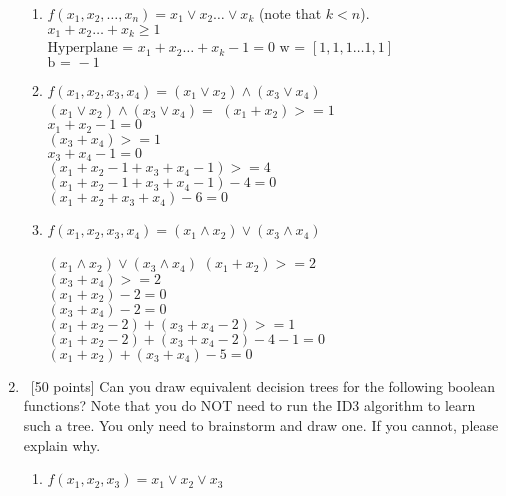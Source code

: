 \documentclass[12pt, fullpage,letterpaper]{article}
\begin{document}
\begin{enumerate}
\begin{enumerate}
\item $f(x_1, x_2, \ldots, x_n) = x_1 \lor x_2 \ldots \lor x_k$ (note that  $k <n$).\\
    $ x_1 + x_2 \ldots + x_k \geq 1$\\
    $\text{Hyperplane = } x_1 + x_2 \ldots + x_k - 1= 0$
    $\text{w = } [1, 1, 1 \dots 1, 1]$\\
    $\text{b = } -1$
\item $f(x_1, x_2, x_3, x_4) = (x_1 \lor x_2) \land (x_3 \lor x_4)$\\

$(x_1 \lor x_2) \land (x_3 \lor x_4) = $
$(x_1 + x_2) >= 1$\\
$x_1 + x_2 - 1 = 0$\\

$(x_3 + x_4) >= 1$\\
$x_3 + x_4 - 1 = 0$\\

$(x_1 + x_2 - 1 + x_3 + x_4 - 1) >= 4$\\
$(x_1 + x_2 - 1 + x_3 + x_4 - 1) - 4 = 0$\\
$(x_1 + x_2 + x_3 + x_4) - 6 = 0$\\


\item $f(x_1, x_2, x_3, x_4) = (x_1 \land x_2) \lor (x_3 \land x_4)$

$(x_1 \land x_2) \lor (x_3 \land x_4)$
$(x_1 + x_2) >= 2$\\
$(x_3 + x_4) >= 2$\\

$(x_1 + x_2) - 2 = 0$\\
$(x_3 + x_4) - 2 = 0$\\

$(x_1 + x_2 - 2) + (x_3 + x_4 - 2) >= 1$\\
$(x_1 + x_2 - 2) + (x_3 + x_4 - 2) - 4 - 1 = 0$\\
$(x_1 + x_2) + (x_3 + x_4) - 5 = 0$\\


\end{enumerate}

\item~[50 points] Can you draw  equivalent decision trees for the following boolean functions? Note that you do NOT need to run the ID3 algorithm to learn such a tree. You only need to brainstorm and draw one. If you cannot, please explain why. 
\begin{enumerate}
\item $f(x_1, x_2, x_3) = x_1 \lor x_2 \lor x_3$


\end{enumerate}
\end{enumerate}
\end{document}
